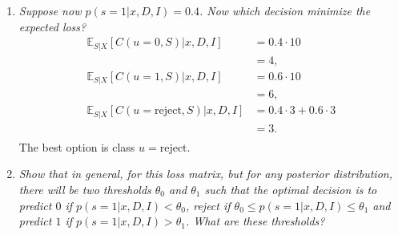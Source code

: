 \begin{example}
\begin{enumerate}
		\item \emph{Suppose now $p(s=1|x,D,I)=0.4$. Now which decision minimize the expected loss?}
		\begin{equation}
			\begin{split}
				\mathbb{E}_{S|X}[C(u=0, S)|x,D,I] &= 0.4\cdot 10 \\
				&= 4,\\
				\mathbb{E}_{S|X}[C(u=1, S)|x,D,I] &= 0.6\cdot 10 \\
				&= 6,\\
				\mathbb{E}_{S|X}[C(u= \text{reject}, S)|x,D,I] &= 0.4\cdot 3+0.6\cdot3 \\
				&= 3.\\
			\end{split}
		\end{equation}
		The best option is class $u=\text{reject}$.
		
		\item \emph{Show that in general, for this loss matrix, but for any posterior distribution, there will be two thresholds $\theta_0$ and $\theta_1$ such that the optimal decision is to predict $0$ if $p(s=1|x,D,I)<\theta_0$, reject if $\theta_0\leq p(s=1|x,D,I)\leq \theta_1$ and predict $1$ if $p(s=1|x,D,I)>\theta_1$. What are these thresholds?}
		

\end{enumerate}
\end{example}
